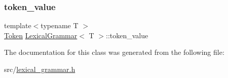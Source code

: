 \mbox{\label{class_lexical_grammar_a3230ebef29d379b7b4c276e2a771edc4}} 
\subsubsection{\texorpdfstring{token\+\_\+value}{token\_value}}
{\footnotesize\ttfamily template$<$typename T $>$ \\
\hyperlink{class_token}{Token} \hyperlink{class_lexical_grammar}{Lexical\+Grammar}$<$ T $>$\+::token\+\_\+value}



The documentation for this class was generated from the following file\+:\begin{DoxyCompactItemize}
\item 
src/\hyperlink{lexical__grammar_8h}{lexical\+\_\+grammar.\+h}\end{DoxyCompactItemize}
